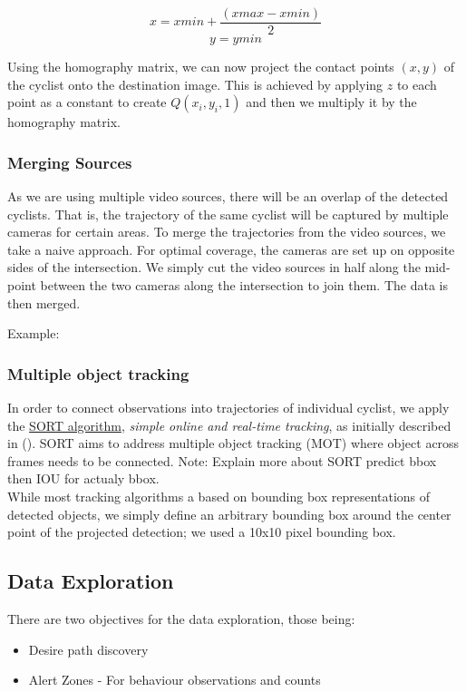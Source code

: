 $$x = xmin + \frac{(xmax - xmin)}{2}$$
$$y = ymin$$

Using the homography matrix, we can now project the contact points $(x, y)$ of the cyclist onto the destination
image. This is achieved by applying $z$ to each point as a constant to create $Q(x_i, y_i, 1)$ and then we multiply it by the homography matrix. 

\subsubsection{Merging Sources}
As we are using multiple video sources, there will be an overlap of the detected cyclists. 
That is, the trajectory of the same cyclist will be captured by multiple cameras for certain areas. 
To merge the trajectories from the video sources, we take a naive approach. For optimal coverage, the cameras are set up on
opposite sides of the intersection. We simply cut the video sources in half along the mid-point between
the two cameras along the intersection to join them. The data is then merged.

Example:

\subsubsection{Multiple object tracking}

In order to connect observations into trajectories of individual cyclist, we apply 
the \href{https://github.com/abewley/sort}{SORT algorithm}, \textit{simple online and real-time tracking}, as initially described in (\cite{Bewley2016_sort}). 
SORT aims to address multiple object tracking (MOT) where object across frames needs to be connected. 
\color{red}
Note: Explain more about SORT predict bbox then IOU for actualy bbox.
\color{black}
\ \\
While most tracking algorithms a based on bounding box representations of detected objects, 
we simply define an arbitrary bounding box around the center point of the projected detection; we used a 10x10 pixel bounding box.

\subsection{Data Exploration}
There are two objectives for the data exploration, those being:
\begin{itemize}
	\item Desire path discovery
	\item Alert Zones - For behaviour observations and counts
\end{itemize}

